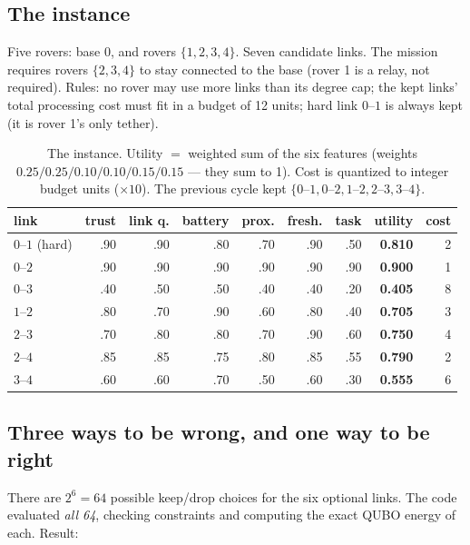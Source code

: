 \documentclass[11pt]{article}
\begin{document}
\subsection{The instance}

Five rovers: base $0$, and rovers $\{1,2,3,4\}$. Seven candidate links. The
mission requires rovers $\{2,3,4\}$ to stay connected to the base (rover 1
is a relay, not required). Rules: no rover may use more links than its
degree cap; the kept links' total processing cost must fit in a budget of
12 units; hard link $0\text{--}1$ is always kept (it is rover 1's only
tether).

\begin{table}[h]
\centering
\small
\begin{tabular}{lrrrrrrrr}
\toprule
link & trust & link q. & battery & prox. & fresh. & task & \textbf{utility} & \textbf{cost} \\
\midrule
$0\text{--}1$ (hard) & .90 & .90 & .80 & .70 & .90 & .50 & \textbf{0.810} & 2 \\
$0\text{--}2$ & .90 & .90 & .90 & .90 & .90 & .90 & \textbf{0.900} & 1 \\
$0\text{--}3$ & .40 & .50 & .50 & .40 & .40 & .20 & \textbf{0.405} & 8 \\
$1\text{--}2$ & .80 & .70 & .90 & .60 & .80 & .40 & \textbf{0.705} & 3 \\
$2\text{--}3$ & .70 & .80 & .80 & .70 & .90 & .60 & \textbf{0.750} & 4 \\
$2\text{--}4$ & .85 & .85 & .75 & .80 & .85 & .55 & \textbf{0.790} & 2 \\
$3\text{--}4$ & .60 & .60 & .70 & .50 & .60 & .30 & \textbf{0.555} & 6 \\
\bottomrule
\end{tabular}
\caption{The instance. Utility $=$ weighted sum of the six features
(weights $0.25/0.25/0.10/0.10/0.15/0.15$ --- they sum to 1). Cost is
quantized to integer budget units ($\times 10$). The previous cycle kept
$\{0\text{--}1, 0\text{--}2, 1\text{--}2, 2\text{--}3, 3\text{--}4\}$.}
\end{table}

\subsection{Three ways to be wrong, and one way to be right}

There are $2^6 = 64$ possible keep/drop choices for the six optional links.
The code evaluated \emph{all 64}, checking constraints and computing the
exact QUBO energy of each. Result:
\end{document}

